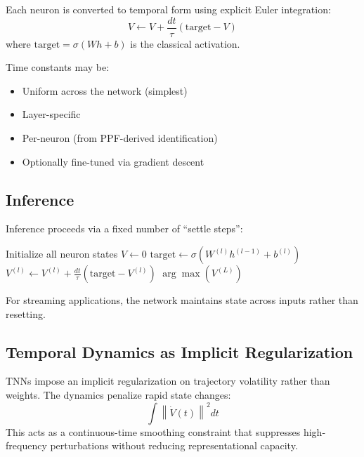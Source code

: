 \documentclass[11pt]{article}
\begin{document}
Each neuron is converted to temporal form using explicit Euler integration:
\begin{equation}
V \leftarrow V + \frac{dt}{\tau}(\text{target} - V)
\end{equation}
where $\text{target} = \sigma(W h + b)$ is the classical activation.

Time constants may be:
\begin{itemize}
    \item Uniform across the network (simplest)
    \item Layer-specific
    \item Per-neuron (from PPF-derived identification)
    \item Optionally fine-tuned via gradient descent
\end{itemize}

\subsection{Inference}

Inference proceeds via a fixed number of ``settle steps'':

\begin{algorithm}[h]
\caption{TNN Inference}
\begin{algorithmic}
\STATE Initialize all neuron states $V \leftarrow 0$
        \STATE $\text{target} \leftarrow \sigma(W^{(l)} h^{(l-1)} + b^{(l)})$
        \STATE $V^{(l)} \leftarrow V^{(l)} + \frac{dt}{\tau}(\text{target} - V^{(l)})$
    \ENDFOR
\ENDFOR
\RETURN $\arg\max(V^{(L)})$
\end{algorithmic}
\end{algorithm}

For streaming applications, the network maintains state across inputs rather than resetting.

\subsection{Temporal Dynamics as Implicit Regularization}

TNNs impose an implicit regularization on trajectory volatility rather than weights. The dynamics penalize rapid state changes:
\begin{equation}
\int \left\| \dot{V}(t) \right\|^2 dt
\end{equation}
This acts as a continuous-time smoothing constraint that suppresses high-frequency perturbations without reducing representational capacity.
\end{document}
